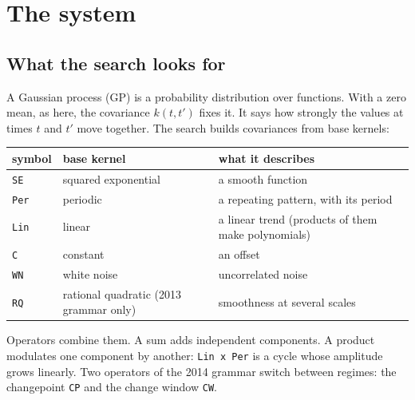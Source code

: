 \documentclass[
]{article}
\begin{document}
\section{The system}\label{the-system}

\subsection{What the search looks for}\label{what-the-search-looks-for}

A Gaussian process (GP) \autocite{rasmussen2006gpml} is a probability
distribution over functions. With a zero mean, as here, the covariance
\(k(t, t')\) fixes it. It says how strongly the values at times \(t\)
and \(t'\) move together. The search builds covariances from base
kernels:

\begin{longtable}[]{@{}
  >{\raggedright\arraybackslash}p{}
  >{\raggedright\arraybackslash}p{}
  >{\raggedright\arraybackslash}p{}@{}}
\toprule\noalign{}
\begin{minipage}[b]{\linewidth}\raggedright
symbol
\end{minipage} & \begin{minipage}[b]{\linewidth}\raggedright
base kernel
\end{minipage} & \begin{minipage}[b]{\linewidth}\raggedright
what it describes
\end{minipage} \\
\midrule\noalign{}
\endhead
\bottomrule\noalign{}
\endlastfoot
\texttt{SE} & squared exponential & a smooth function \\
\texttt{Per} & periodic & a repeating pattern, with its period \\
\texttt{Lin} & linear & a linear trend (products of them make
polynomials) \\
\texttt{C} & constant & an offset \\
\texttt{WN} & white noise & uncorrelated noise \\
\texttt{RQ} & rational quadratic (2013 grammar only) & smoothness at
several scales \\
\end{longtable}

Operators combine them. A sum adds independent components. A product
modulates one component by another: \texttt{Lin\ x\ Per} is a cycle
whose amplitude grows linearly. Two operators of the 2014 grammar switch
between regimes: the changepoint \texttt{CP} and the change window
\texttt{CW}.
\end{document}
